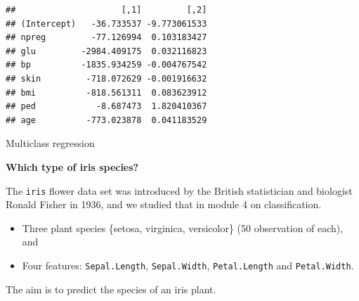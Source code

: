 \documentclass[10pt,ignorenonframetext,]{beamer}
\providecommand{\tightlist}{%
  \setlength{\itemsep}{0pt}\setlength{\parskip}{0pt}}
\begin{document}
\begin{frame}[fragile]
\begin{verbatim}
##                     [,1]         [,2]
## (Intercept)   -36.733537 -9.773061533
## npreg         -77.126994  0.103183427
## glu         -2984.409175  0.032116823
## bp          -1835.934259 -0.004767542
## skin         -718.072629 -0.001916632
## bmi          -818.561311  0.083623912
## ped            -8.687473  1.820410367
## age          -773.023878  0.041183529
\end{verbatim}

\end{frame}

\begin{frame}[fragile]{Multiclass regression}
\protect\hypertarget{multiclass-regression}{}

\textbf{Which type of iris species?}

The \texttt{iris} flower data set was introduced by the British
statistician and biologist Ronald Fisher in 1936, and we studied that in
module 4 on classification.

\begin{itemize}
\tightlist
\item
  Three plant species \{setosa, virginica, versicolor\} (50 observation
  of each), and
\item
  Four features: \texttt{Sepal.Length}, \texttt{Sepal.Width},
  \texttt{Petal.Length} and \texttt{Petal.Width}.
\end{itemize}

The aim is to predict the species of an iris plant.

\end{frame}
\end{document}
